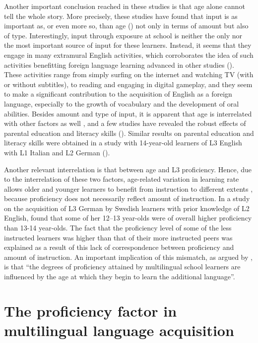 \documentclass[output=paper,colorlinks,citecolor=brown,nonflat]{../langscibook}
\begin{document}
Another important conclusion reached in these studies is that age alone cannot tell the whole story. More precisely, these studies have found that input is as important as, or even more so, than age (\citealt{Muñoz2006, Muñoz2014, Muñoz2019, PfenningerSingleton2017}) not only in terms of amount but also of type. Interestingly, input through exposure at school is neither the only nor the most important source of input for these learners. Instead, it seems that they engage in many extramural English activities, which corroborates the idea of such activities benefitting foreign language learning advanced in other studies (\citealt{SundqvistSylvén2014}). These activities range from simply surfing on the internet and watching TV (with or without subtitles), to reading and engaging in digital gameplay, and they seem to make a significant contribution to the acquisition of English as a foreign language, especially to the growth of vocabulary and the development of oral abilities. Besides amount and type of input, it is apparent that age is interrelated with other factors as well \citep{Muñoz2014}, and a few studies have revealed the robust effects of parental education and literacy skills (\citealt{PfenningerSingleton2017, Muñoz2019, MuñozSingleton2019}). Similar results on parental education and literacy skills were obtained in a study with 14-year-old learners of L3 English with L1 Italian and L2 German (\citealt{DeAngelis2015}).

Another relevant interrelation is that between age and L3 proficiency. Hence, due to the interrelation of these two factors, age-related variation in learning rate allows older and younger learners to benefit from instruction to different extents \citep{Muñoz2006}, because proficiency does not necessarily reflect amount of instruction. In a study on the acquisition of L3 German by Swedish learners with prior knowledge of L2 English, \citet{Sayehli2001} found that some of her 12--13 year-olds were of overall higher proficiency than 13-14 year-olds. The fact that the proficiency level of some of the less instructed learners was higher than that of their more instructed peers was explained as a result of this lack of correspondence between proficiency and amount of instruction. An important implication of this mismatch, as argued by \citet[214]{MuñozSingleton2019}, is that “the degrees of proficiency attained by multilingual school learners are influenced by the age at which they begin to learn the additional language”.

\section{The proficiency factor in multilingual language acquisition}\label{sec:sanchez1:3}
\end{document}
